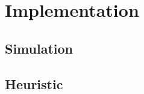 \documentclass[
    fontsize=10pt,    %
    a4paper,      %
    parskip=half-,    %
    twoside,      %
    headings=big,  %
    appendixprefix=true,
    ]{scrreprt}    %
\begin{document}
\chapter{Implementation}\label{chapter:xxxname3xxx}
%


\section{Simulation}\label{chapter:sim}


\section{Heuristic}\label{chapter:heur}







%

%

%




\end{document}
